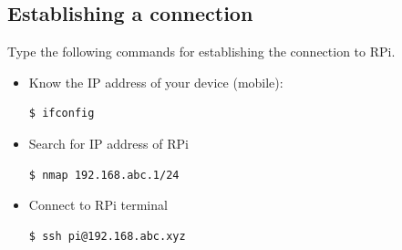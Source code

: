 \documentclass{article}
\begin{document}
\subsection{Establishing a connection}
Type the following commands for establishing the connection to RPi.
\begin{itemize}
    \item Know the IP address of your device (mobile):
    \begin{lstlisting}[language=bash]
    $ ifconfig
    \end{lstlisting}
    \item Search for IP address of RPi
    \begin{lstlisting}[language=bash]
    $ nmap 192.168.abc.1/24
    \end{lstlisting}
    \item Connect to RPi terminal
    \begin{lstlisting}[language=bash]
    $ ssh pi@192.168.abc.xyz
    \end{lstlisting}
    
        
\end{itemize}
\end{document}
